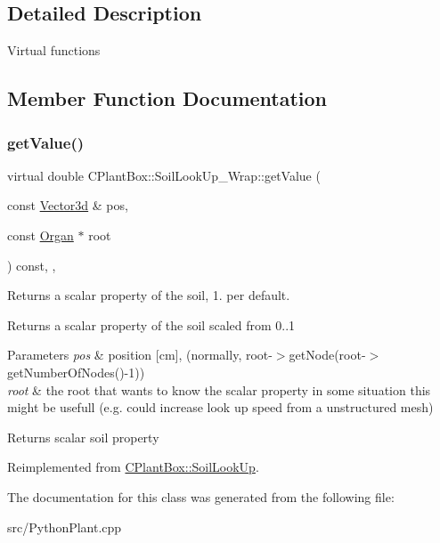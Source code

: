 \subsection{Detailed Description}
Virtual functions 

\subsection{Member Function Documentation}
\mbox{\label{classCPlantBox_1_1SoilLookUp__Wrap_aa0d7d887b8dba944b504bb9c28cb87ac}} 
\subsubsection{\texorpdfstring{get\+Value()}{getValue()}}
{\footnotesize\ttfamily virtual double C\+Plant\+Box\+::\+Soil\+Look\+Up\+\_\+\+Wrap\+::get\+Value (\begin{DoxyParamCaption}\item[{const \hyperlink{classCPlantBox_1_1Vector3d}{Vector3d} \&}]{pos,  }\item[{const \hyperlink{classCPlantBox_1_1Organ}{Organ} $\ast$}]{root }\end{DoxyParamCaption}) const\hspace{0.3cm}{\ttfamily [inline]}, {\ttfamily [override]}, {\ttfamily [virtual]}}



Returns a scalar property of the soil, 1. per default. 

Returns a scalar property of the soil scaled from 0..1


\begin{DoxyParams}{Parameters}
{\em pos} & position \mbox{[}cm\mbox{]}, (normally, root-\/$>$get\+Node(root-\/$>$get\+Number\+Of\+Nodes()-\/1)) \\
\hline
{\em root} & the root that wants to know the scalar property in some situation this might be usefull (e.\+g. could increase look up speed from a unstructured mesh) \\
\hline
\end{DoxyParams}
\begin{DoxyReturn}{Returns}
scalar soil property 
\end{DoxyReturn}


Reimplemented from \hyperlink{classCPlantBox_1_1SoilLookUp_a46ace0d168532b6eb9bec8e6a1d64814}{C\+Plant\+Box\+::\+Soil\+Look\+Up}.



The documentation for this class was generated from the following file\+:\begin{DoxyCompactItemize}
\item 
src/Python\+Plant.\+cpp\end{DoxyCompactItemize}
